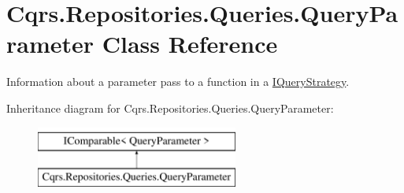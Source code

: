 \hypertarget{classCqrs_1_1Repositories_1_1Queries_1_1QueryParameter}{}\section{Cqrs.\+Repositories.\+Queries.\+Query\+Parameter Class Reference}
\label{classCqrs_1_1Repositories_1_1Queries_1_1QueryParameter}


Information about a parameter pass to a function in a \hyperlink{interfaceCqrs_1_1Repositories_1_1Queries_1_1IQueryStrategy}{I\+Query\+Strategy}.  


Inheritance diagram for Cqrs.\+Repositories.\+Queries.\+Query\+Parameter\+:\begin{figure}[H]
\begin{center}
\leavevmode
\includegraphics[height=2.000000cm]{classCqrs_1_1Repositories_1_1Queries_1_1QueryParameter}
\end{center}
\end{figure}
